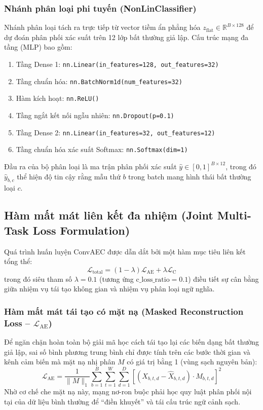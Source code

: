 \documentclass[11pt,journal,onecolumn]{IEEEtran}
\begin{document}
\subsubsection{Nhánh phân loại phi tuyến (NonLinClassifier)}
Nhánh phân loại tách ra trực tiếp từ vector tiềm ẩn phẳng hóa $z_{\text{flat}} \in \mathbb{R}^{B \times 128}$ để dự đoán phân phối xác suất trên 12 lớp bất thường giả lập.
Cấu trúc mạng đa tầng (MLP) bao gồm:
\begin{enumerate}
    \item Tầng Dense 1: \texttt{nn.Linear(in\_features=128, out\_features=32)}
    \item Tầng chuẩn hóa: \texttt{nn.BatchNorm1d(num\_features=32)}
    \item Hàm kích hoạt: \texttt{nn.ReLU()}
    \item Tầng ngắt kết nối ngẫu nhiên: \texttt{nn.Dropout(p=0.1)}
    \item Tầng Dense 2: \texttt{nn.Linear(in\_features=32, out\_features=12)}
    \item Tầng chuẩn hóa xác suất Softmax: \texttt{nn.Softmax(dim=1)}
\end{enumerate}
Đầu ra của bộ phân loại là ma trận phân phối xác suất $\hat{y} \in [0, 1]^{B \times 12}$, trong đó $\hat{y}_{b, c}$ thể hiện độ tin cậy rằng mẫu thứ $b$ trong batch mang hình thái bất thường loại $c$.

\subsection{Hàm mất mát liên kết đa nhiệm (Joint Multi-Task Loss Formulation)}
Quá trình huấn luyện ConvAEC được dẫn dắt bởi một hàm mục tiêu liên kết tổng thể:
\begin{equation}
\label{eq:joint_loss}
\mathcal{L}_{\text{total}} = (1 - \lambda)\mathcal{L}_{\text{AE}} + \lambda \mathcal{L}_{\text{C}}
\end{equation}
trong đó siêu tham số $\lambda = 0.1$ (tương ứng $\text{c\_loss\_ratio} = 0.1$) điều tiết sự cân bằng giữa nhiệm vụ tái tạo không gian và nhiệm vụ phân loại ngữ nghĩa.

\subsubsection{Hàm mất mát tái tạo có mặt nạ (Masked Reconstruction Loss -- $\mathcal{L}_{\text{AE}}$)}
Để ngăn chặn hoàn toàn bộ giải mã học cách tái tạo lại các biến dạng bất thường giả lập, sai số bình phương trung bình chỉ được tính trên các bước thời gian và kênh cảm biến mà mặt nạ nhị phân $M$ có giá trị bằng 1 (vùng sạch nguyên bản):
\begin{equation}
\label{eq:loss_ae}
\mathcal{L}_{\text{AE}} = \frac{1}{\|M\|_1} \sum_{b=1}^B \sum_{t=1}^W \sum_{d=1}^D \left[ (X_{b,t,d} - \hat{X}_{b,t,d}) \cdot M_{b,t,d} \right]^2
\end{equation}
Nhờ cơ chế che mặt nạ này, mạng nơ-ron buộc phải học quy luật phân phối nội tại của dữ liệu bình thường để ``điền khuyết'' và tái cấu trúc ngữ cảnh sạch.
\end{document}
